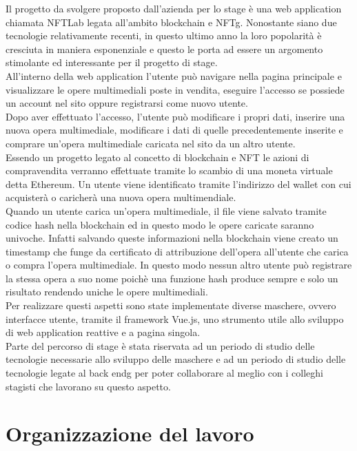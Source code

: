 Il progetto da svolgere proposto dall'azienda per lo stage è una web application chiamata NFTLab legata all'ambito blockchain e \gls{NFTg}. Nonostante siano due tecnologie relativamente recenti, in questo ultimo anno la loro popolarità è cresciuta in maniera esponenziale e questo le porta ad essere un argomento stimolante ed interessante per il progetto di stage.\\
All'interno della web application l'utente può navigare nella pagina principale e visualizzare le opere multimediali poste in vendita, eseguire l'accesso se possiede un account nel sito oppure registrarsi come nuovo utente.\\
Dopo aver effettuato l'accesso, l'utente può modificare i propri dati, inserire una nuova opera multimediale, modificare i dati di quelle precedentemente inserite e comprare un'opera multimediale caricata nel sito da un altro utente.\\
Essendo un progetto legato al concetto di blockchain e \gls{NFT} le azioni di compravendita verranno effettuate tramite lo scambio di una moneta virtuale detta Ethereum. Un utente viene identificato tramite l'indirizzo del wallet con cui acquisterà o caricherà una nuova opera multimendiale.\\
Quando un utente carica un'opera multimediale, il file viene salvato tramite codice hash nella blockchain ed in questo modo le opere caricate saranno univoche. Infatti salvando queste informazioni nella blockchain viene creato un timestamp che funge da certificato di attribuzione dell'opera all'utente che carica o compra l'opera multimediale. In questo modo nessun altro utente può registrare la stessa opera a suo nome poichè una funzione hash produce sempre e solo un risultato rendendo uniche le opere multimediali.\\
Per realizzare questi aspetti sono state implementate diverse maschere, ovvero interfacce utente, tramite il framework Vue.js, uno strumento utile allo sviluppo di web application reattive e a pagina singola.\\
Parte del percorso di stage è stata riservata ad un periodo di studio delle tecnologie necessarie allo sviluppo delle maschere e ad un periodo di studio delle tecnologie legate al \gls{back endg} per poter collaborare al meglio con i colleghi stagisti che lavorano su questo aspetto.

\section{Organizzazione del lavoro}

